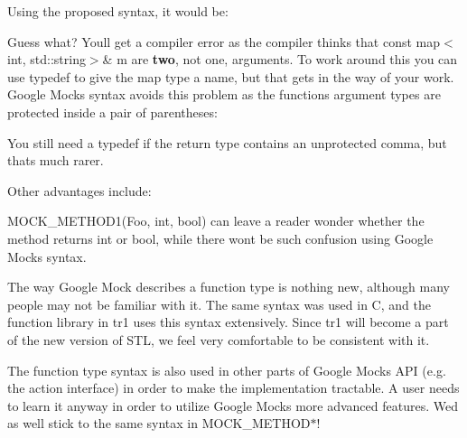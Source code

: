 Using the proposed syntax, it would be\+: 
\begin{DoxyCode}{0}
\end{DoxyCode}


Guess what? You\textquotesingle{}ll get a compiler error as the compiler thinks that {\ttfamily const map$<$int, std\+::string$>$\& m} are {\bfseries two}, not one, arguments. To work around this you can use {\ttfamily typedef} to give the map type a name, but that gets in the way of your work. Google Mock\textquotesingle{}s syntax avoids this problem as the function\textquotesingle{}s argument types are protected inside a pair of parentheses\+: 
\begin{DoxyCode}{0}
\end{DoxyCode}


You still need a {\ttfamily typedef} if the return type contains an unprotected comma, but that\textquotesingle{}s much rarer.

Other advantages include\+:
\begin{DoxyEnumerate}
\item {\ttfamily M\+O\+C\+K\+\_\+\+M\+E\+T\+H\+O\+D1(\+Foo, int, bool)} can leave a reader wonder whether the method returns {\ttfamily int} or {\ttfamily bool}, while there won\textquotesingle{}t be such confusion using Google Mock\textquotesingle{}s syntax.
\end{DoxyEnumerate}
\begin{DoxyEnumerate}
\item The way Google Mock describes a function type is nothing new, although many people may not be familiar with it. The same syntax was used in C, and the {\ttfamily function} library in {\ttfamily tr1} uses this syntax extensively. Since {\ttfamily tr1} will become a part of the new version of S\+TL, we feel very comfortable to be consistent with it.
\end{DoxyEnumerate}
\begin{DoxyEnumerate}
\item The function type syntax is also used in other parts of Google Mock\textquotesingle{}s A\+PI (e.\+g. the action interface) in order to make the implementation tractable. A user needs to learn it anyway in order to utilize Google Mock\textquotesingle{}s more advanced features. We\textquotesingle{}d as well stick to the same syntax in {\ttfamily M\+O\+C\+K\+\_\+\+M\+E\+T\+H\+O\+D$\ast$}!
\end{DoxyEnumerate}

